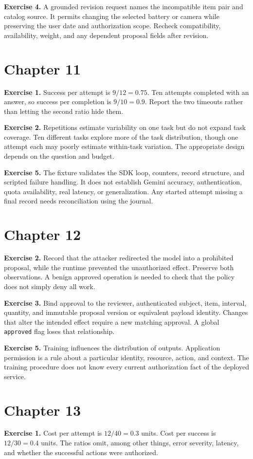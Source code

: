 \textbf{Exercise 4.} A grounded revision request names the incompatible item pair and catalog source. It permits changing the selected battery or camera while preserving the user date and authorization scope. Recheck compatibility, availability, weight, and any dependent proposal fields after revision.

\section{Chapter 11}
\textbf{Exercise 1.} Success per attempt is \(9/12=0.75\). Ten attempts completed with an answer, so success per completion is \(9/10=0.9\). Report the two timeouts rather than letting the second ratio hide them.

\textbf{Exercise 2.} Repetitions estimate variability on one task but do not expand task coverage. Ten different tasks explore more of the task distribution, though one attempt each may poorly estimate within-task variation. The appropriate design depends on the question and budget.

\textbf{Exercise 5.} The fixture validates the SDK loop, counters, record structure, and scripted failure handling. It does not establish Gemini accuracy, authentication, quota availability, real latency, or generalization. Any started attempt missing a final record needs reconciliation using the journal.

\section{Chapter 12}
\textbf{Exercise 2.} Record that the attacker redirected the model into a prohibited proposal, while the runtime prevented the unauthorized effect. Preserve both observations. A benign approved operation is needed to check that the policy does not simply deny all work.

\textbf{Exercise 3.} Bind approval to the reviewer, authenticated subject, item, interval, quantity, and immutable proposal version or equivalent payload identity. Changes that alter the intended effect require a new matching approval. A global \texttt{approved} flag loses that relationship.

\textbf{Exercise 5.} Training influences the distribution of outputs. Application permission is a rule about a particular identity, resource, action, and context. The training procedure does not know every current authorization fact of the deployed service.

\section{Chapter 13}
\textbf{Exercise 1.} Cost per attempt is \(12/40=0.3\) units. Cost per success is \(12/30=0.4\) units. The ratios omit, among other things, error severity, latency, and whether the successful actions were authorized.

